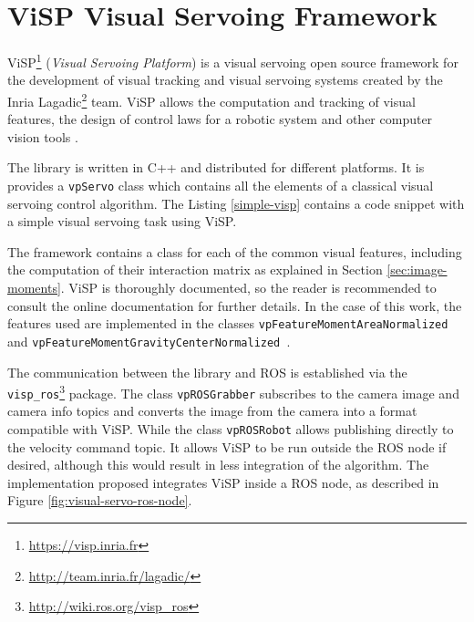 \pagebreak

\section{ViSP Visual Servoing Framework}
\label{sec:visp}

ViSP\footnote{\url{https://visp.inria.fr}} (\emph{Visual Servoing Platform}) is a visual servoing open source framework for the development of visual tracking and visual servoing systems created by the Inria Lagadic\footnote{\url{http://team.inria.fr/lagadic/}} team. ViSP allows the computation and tracking of visual features, the design of control laws for a robotic system and other computer vision tools \cite{visp_hp}.


The library is written in C++ and distributed for different platforms. It is provides a \texttt{vpServo} class which contains all the elements of a classical visual servoing control algorithm. The Listing \ref{simple-visp} contains a code snippet with a simple visual servoing task using ViSP.

The framework contains a class for each of the common visual features, including the computation of their interaction matrix as explained in Section \ref{sec:image-moments}. ViSP is thoroughly documented, so the reader is recommended to consult the online documentation\cite{visp_doc} for further details. In the case of this work, the features used are implemented in the classes \texttt{vpFeatureMomentAreaNormalized} and \texttt{vpFeatureMomentGravityCenterNormalized }.

The communication between the library and ROS is established via the \texttt{visp\_ros}\footnote{\url{http://wiki.ros.org/visp_ros}} package. The class \texttt{vpROSGrabber} subscribes to the camera image and camera info topics and converts the image from the camera into a format compatible with ViSP. While the class \texttt{vpROSRobot} allows publishing directly to the velocity command topic. It allows ViSP to be run outside the ROS node if desired, although this would result in less integration of the algorithm. The implementation proposed integrates ViSP inside a ROS node, as described in Figure \ref{fig:visual-servo-ros-node}.
  

